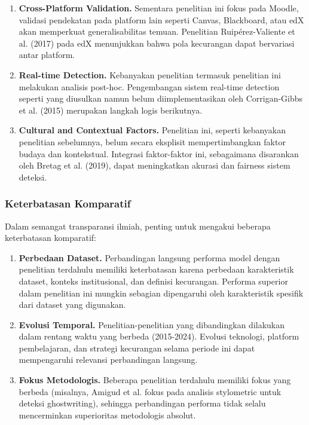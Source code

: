 \begin{enumerate}
    \item \textbf{Cross-Platform Validation.} Sementara penelitian ini fokus pada Moodle, validasi pendekatan pada platform lain seperti Canvas, Blackboard, atau edX akan memperkuat generalisabilitas temuan. Penelitian Ruipérez-Valiente et al. (2017) pada edX menunjukkan bahwa pola kecurangan dapat bervariasi antar platform.
    
    \item \textbf{Real-time Detection.} Kebanyakan penelitian termasuk penelitian ini melakukan analisis post-hoc. Pengembangan sistem real-time detection seperti yang diusulkan namun belum diimplementasikan oleh Corrigan-Gibbs et al. (2015) merupakan langkah logis berikutnya.
    
    \item \textbf{Cultural and Contextual Factors.} Penelitian ini, seperti kebanyakan penelitian sebelumnya, belum secara eksplisit mempertimbangkan faktor budaya dan kontekstual. Integrasi faktor-faktor ini, sebagaimana disarankan oleh Bretag et al. (2019), dapat meningkatkan akurasi dan fairness sistem deteksi.
\end{enumerate}

\subsubsection{Keterbatasan Komparatif}

Dalam semangat transparansi ilmiah, penting untuk mengakui beberapa keterbatasan komparatif:

\begin{enumerate}
    \item \textbf{Perbedaan Dataset.} Perbandingan langsung performa model dengan penelitian terdahulu memiliki keterbatasan karena perbedaan karakteristik dataset, konteks institusional, dan definisi kecurangan. Performa superior dalam penelitian ini mungkin sebagian dipengaruhi oleh karakteristik spesifik dari dataset yang digunakan.
    
    \item \textbf{Evolusi Temporal.} Penelitian-penelitian yang dibandingkan dilakukan dalam rentang waktu yang berbeda (2015-2024). Evolusi teknologi, platform pembelajaran, dan strategi kecurangan selama periode ini dapat mempengaruhi relevansi perbandingan langsung.
    
    \item \textbf{Fokus Metodologis.} Beberapa penelitian terdahulu memiliki fokus yang berbeda (misalnya, Amigud et al. fokus pada analisis stylometric untuk deteksi ghostwriting), sehingga perbandingan performa tidak selalu mencerminkan superioritas metodologis absolut.
\end{enumerate}

